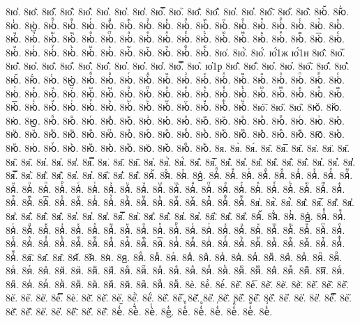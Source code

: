 {8ю҅̇.
8ю҅̈.
8ю҅̋.
8ю҅̏.
8ю҅̑.
8ю҅̓.
8ю҅̔.
8ю҅̾.
8ю҅̿.
8ю҅͘.
8ю҅҃.
8ю҅҄.
8ю҅҅.
8ю҅҆.
8ю҅҇.
8ю҅᷀.
8ю҅᷁.
8ю҅᷶.
8ю᷷҅.
8ю᷸҅.
8ю᷹҅.
8ю҅ⷠ.
8ю҅ⷡ.
8ю҅ⷢ.
8ю҅ⷣ.
8ю҅ⷤ.
8ю҅ⷥ.
8ю҅ⷦ.
8ю҅ⷧ.
8ю҅ⷨ.
8ю҅ⷩ.
8ю҅ⷪ.
8ю҅ⷫ.
8ю҅ⷬ.
8ю҅ⷭ.
8ю҅ⷮ.
8ю҅ⷯ.
8ю҅ⷰ.
8ю҅ⷱ.
8ю҅ⷲ.
8ю҅ⷳ.
8ю҅ⷴ.
8ю҅ⷵ.
8ю҅ⷶ.
8ю҅ⷷ.
8ю҅ⷸ.
8ю҅ⷹ.
8ю҅ⷺ.
8ю҅ⷻ.
8ю҅ⷼ.
8ю҅ⷽ.
8ю҅ⷾ.
8ю҅ⷿ.
8ю҅꙯.
8ю҅ꙴ.
8ю҅ꙵ.
8ю҅ꙶ.
8ю҅ꙷ.
8ю҅ꙸ.
8ю҅ꙹ.
8ю҅ꙺ.
8ю҅ꙻ.
8ю҅꙼.
8ю҅꙽.
8ю҅ꚞ.
8ю҅ꚟ.
8ю҆.
8ю҆̀.
8ю҆́.
ю҆́1ж
ю҆́1н
8ю҆̂.
8ю҆̅.
8ю҆̆.
8ю҆̇.
8ю҆̈.
8ю҆̋.
8ю҆̏.
8ю҆̑.
8ю҆̓.
8ю҆̔.
8ю҆̾.
8ю҆̿.
8ю҆͘.
ю҆1р
8ю҆҃.
8ю҆҄.
8ю҆҅.
8ю҆҆.
8ю҆҇.
8ю҆᷀.
8ю҆᷁.
8ю҆᷶.
8ю᷷҆.
8ю᷸҆.
8ю᷹҆.
8ю҆ⷠ.
8ю҆ⷡ.
8ю҆ⷢ.
8ю҆ⷣ.
8ю҆ⷤ.
8ю҆ⷥ.
8ю҆ⷦ.
8ю҆ⷧ.
8ю҆ⷨ.
8ю҆ⷩ.
8ю҆ⷪ.
8ю҆ⷫ.
8ю҆ⷬ.
8ю҆ⷭ.
8ю҆ⷮ.
8ю҆ⷯ.
8ю҆ⷰ.
8ю҆ⷱ.
8ю҆ⷲ.
8ю҆ⷳ.
8ю҆ⷴ.
8ю҆ⷵ.
8ю҆ⷶ.
8ю҆ⷷ.
8ю҆ⷸ.
8ю҆ⷹ.
8ю҆ⷺ.
8ю҆ⷻ.
8ю҆ⷼ.
8ю҆ⷽ.
8ю҆ⷾ.
8ю҆ⷿ.
8ю҆꙯.
8ю҆ꙴ.
8ю҆ꙵ.
8ю҆ꙶ.
8ю҆ꙷ.
8ю҆ꙸ.
8ю҆ꙹ.
8ю҆ꙺ.
8ю҆ꙻ.
8ю҆꙼.
8ю҆꙽.
8ю҆ꚞ.
8ю҆ꚟ.
8ю҇.
8ю᷀.
8ю᷁.
8ю᷶.
8ю᷷.
8ю᷸.
8ю᷹.
8юⷠ.
8юⷡ.
8юⷢ.
8юⷣ.
8юⷤ.
8юⷥ.
8юⷦ.
8юⷧ.
8юⷨ.
8юⷩ.
8юⷪ.
8юⷫ.
8юⷬ.
8юⷭ.
8юⷮ.
8юⷯ.
8юⷰ.
8юⷱ.
8юⷲ.
8юⷳ.
8юⷴ.
8юⷵ.
8юⷶ.
8юⷷ.
8юⷸ.
8юⷹ.
8юⷺ.
8юⷻ.
8юⷼ.
8юⷽ.
8юⷾ.
8юⷿ.
8ю꙯.
8юꙴ.
8юꙵ.
8юꙶ.
8юꙷ.
8юꙸ.
8юꙹ.
8юꙺ.
8юꙻ.
8ю꙼.
8ю꙽.
8юꚞ.
8юꚟ.
8я.
8я̀.
8я́.
8я̂.
8я̅.
8я̆.
8я̇.
8я̈.
8я̋.
8я̏.
8я̑.
8я̓.
8я̔.
8я̾.
8я̿.
8я͘.
8я҃.
8я҄.
8я҅.
8я҅̀.
8я҅́.
8я҅̂.
8я҅̅.
8я҅̆.
8я҅̇.
8я҅̈.
8я҅̋.
8я҅̏.
8я҅̑.
8я҅̓.
8я҅̔.
8я҅̾.
8я҅̿.
8я҅͘.
8я҅҃.
8я҅҄.
8я҅҅.
8я҅҆.
8я҅҇.
8я҅᷀.
8я҅᷁.
8я҅᷶.
8я᷷҅.
8я᷸҅.
8я᷹҅.
8я҅ⷠ.
8я҅ⷡ.
8я҅ⷢ.
8я҅ⷣ.
8я҅ⷤ.
8я҅ⷥ.
8я҅ⷦ.
8я҅ⷧ.
8я҅ⷨ.
8я҅ⷩ.
8я҅ⷪ.
8я҅ⷫ.
8я҅ⷬ.
8я҅ⷭ.
8я҅ⷮ.
8я҅ⷯ.
8я҅ⷰ.
8я҅ⷱ.
8я҅ⷲ.
8я҅ⷳ.
8я҅ⷴ.
8я҅ⷵ.
8я҅ⷶ.
8я҅ⷷ.
8я҅ⷸ.
8я҅ⷹ.
8я҅ⷺ.
8я҅ⷻ.
8я҅ⷼ.
8я҅ⷽ.
8я҅ⷾ.
8я҅ⷿ.
8я҅꙯.
8я҅ꙴ.
8я҅ꙵ.
8я҅ꙶ.
8я҅ꙷ.
8я҅ꙸ.
8я҅ꙹ.
8я҅ꙺ.
8я҅ꙻ.
8я҅꙼.
8я҅꙽.
8я҅ꚞ.
8я҅ꚟ.
8я҆.
8я҆̀.
8я҆́.
8я҆̂.
8я҆̅.
8я҆̆.
8я҆̇.
8я҆̈.
8я҆̋.
8я҆̏.
8я҆̑.
8я҆̓.
8я҆̔.
8я҆̾.
8я҆̿.
8я҆͘.
8я҆҃.
8я҆҄.
8я҆҅.
8я҆҆.
8я҆҇.
8я҆᷀.
8я҆᷁.
8я҆᷶.
8я᷷҆.
8я᷸҆.
8я᷹҆.
8я҆ⷠ.
8я҆ⷡ.
8я҆ⷢ.
8я҆ⷣ.
8я҆ⷤ.
8я҆ⷥ.
8я҆ⷦ.
8я҆ⷧ.
8я҆ⷨ.
8я҆ⷩ.
8я҆ⷪ.
8я҆ⷫ.
8я҆ⷬ.
8я҆ⷭ.
8я҆ⷮ.
8я҆ⷯ.
8я҆ⷰ.
8я҆ⷱ.
8я҆ⷲ.
8я҆ⷳ.
8я҆ⷴ.
8я҆ⷵ.
8я҆ⷶ.
8я҆ⷷ.
8я҆ⷸ.
8я҆ⷹ.
8я҆ⷺ.
8я҆ⷻ.
8я҆ⷼ.
8я҆ⷽ.
8я҆ⷾ.
8я҆ⷿ.
8я҆꙯.
8я҆ꙴ.
8я҆ꙵ.
8я҆ꙶ.
8я҆ꙷ.
8я҆ꙸ.
8я҆ꙹ.
8я҆ꙺ.
8я҆ꙻ.
8я҆꙼.
8я҆꙽.
8я҆ꚞ.
8я҆ꚟ.
8я҇.
8я᷀.
8я᷁.
8я᷶.
8я᷷.
8я᷸.
8я᷹.
8яⷠ.
8яⷡ.
8яⷢ.
8яⷣ.
8яⷤ.
8яⷥ.
8яⷦ.
8яⷧ.
8яⷨ.
8яⷩ.
8яⷪ.
8яⷫ.
8яⷬ.
8яⷭ.
8яⷮ.
8яⷯ.
8яⷰ.
8яⷱ.
8яⷲ.
8яⷳ.
8яⷴ.
8яⷵ.
8яⷶ.
8яⷷ.
8яⷸ.
8яⷹ.
8яⷺ.
8яⷻ.
8яⷼ.
8яⷽ.
8яⷾ.
8яⷿ.
8я꙯.
8яꙴ.
8яꙵ.
8яꙶ.
8яꙷ.
8яꙸ.
8яꙹ.
8яꙺ.
8яꙻ.
8я꙼.
8я꙽.
8яꚞ.
8яꚟ.
8ѐ.
8ѐ̀.
8ѐ́.
8ѐ̂.
8ѐ̅.
8ѐ̆.
8ѐ̇.
8ѐ̈.
8ѐ̋.
8ѐ̏.
8ѐ̑.
8ѐ̓.
8ѐ̔.
8ѐ̾.
8ѐ̿.
8ѐ͘.
8ѐ҃.
8ѐ҄.
8ѐ҅.
8ѐ҅̀.
8ѐ҅́.
8ѐ҅̂.
8ѐ҅̅.
8ѐ҅̆.
8ѐ҅̇.
8ѐ҅̈.
8ѐ҅̋.
8ѐ҅̏.
8ѐ҅̑.
8ѐ҅̓.
8ѐ҅̔.
8ѐ҅̾.
8ѐ҅̿.
8ѐ҅͘.
8ѐ҅҃.
8ѐ҅҄.
8ѐ҅҅.
8ѐ҅҆.
8ѐ҅҇.
8ѐ҅᷀.
8ѐ҅᷁.
8ѐ҅᷶.
8ѐ᷷҅.
8ѐ᷸҅.
8ѐ᷹҅.
8ѐ҅ⷠ.
8ѐ҅ⷡ.
8ѐ҅ⷢ.
8ѐ҅ⷣ.
8ѐ҅ⷤ.
8ѐ҅ⷥ.
}
